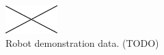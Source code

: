 \begin{figure}
  \centering
  \includegraphics[width=2cm]{./fig/void.jpg}
  \caption{ \scriptsize{Robot demonstration data. (TODO)}
}
\label{fig:demo_result}
\end{figure}